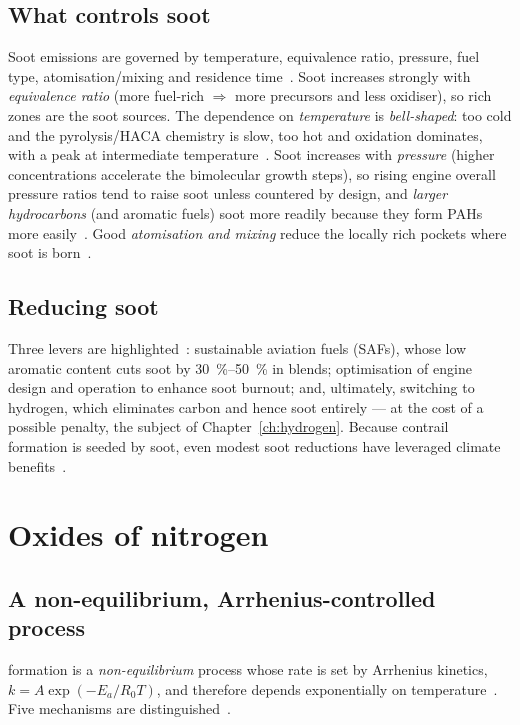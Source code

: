 \subsection{What controls soot}

Soot emissions are governed by temperature, equivalence ratio, pressure, fuel type, atomisation/mixing and residence time~\cite{lecture12}. Soot increases strongly with \emph{equivalence ratio} (more fuel-rich $\Rightarrow$ more precursors and less oxidiser), so rich zones are the soot sources. The dependence on \emph{temperature} is \emph{bell-shaped}: too cold and the pyrolysis/HACA chemistry is slow, too hot and oxidation dominates, with a peak at intermediate temperature~\cite{lecture12}. Soot increases with \emph{pressure} (higher concentrations accelerate the bimolecular growth steps), so rising engine overall pressure ratios tend to raise soot unless countered by design, and \emph{larger hydrocarbons} (and aromatic fuels) soot more readily because they form PAHs more easily~\cite{lecture12}. Good \emph{atomisation and mixing} reduce the locally rich pockets where soot is born~\cite{lecture12}.

\subsection{Reducing soot}

Three levers are highlighted~\cite{lecture12}: sustainable aviation fuels (SAFs), whose low aromatic content cuts soot by \SIrange{30}{50}{\percent} in blends; optimisation of engine design and operation to enhance soot burnout; and, ultimately, switching to hydrogen, which eliminates carbon and hence soot entirely --- at the cost of a possible  penalty, the subject of Chapter~\ref{ch:hydrogen}. Because contrail formation is seeded by soot, even modest soot reductions have leveraged climate benefits~\cite{lecture12}.

\section{Oxides of nitrogen}

\subsection{A non-equilibrium, Arrhenius-controlled process}

 formation is a \emph{non-equilibrium} process whose rate is set by Arrhenius kinetics, $k=A\exp(-E_a/R_0T)$, and therefore depends exponentially on temperature~\cite{lecture13}. Five mechanisms are distinguished~\cite{lecture13}.

